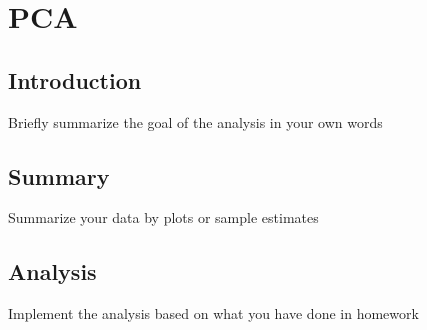 \documentclass[11pt,a4paper]{article}
\begin{document}
	\section{PCA}
	
	\subsection{Introduction}
	Briefly summarize the goal of the analysis in your own words
	\subsection{Summary}
	Summarize your data by plots or sample estimates
	\subsection{Analysis}
	Implement the analysis based on what you have done in homework
	
\end{document}
